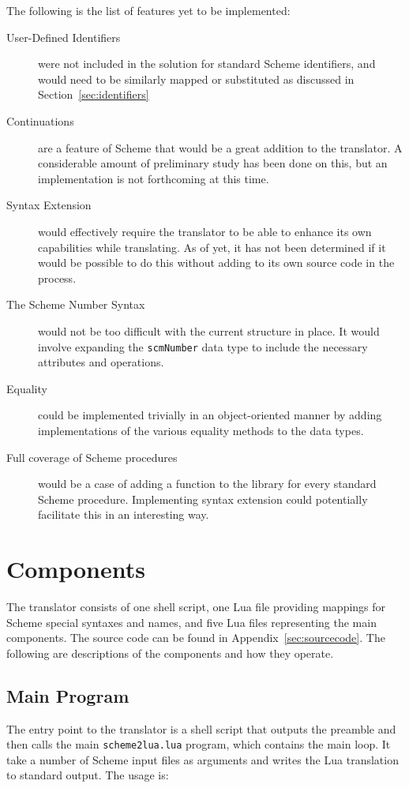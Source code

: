 The following is the list of features yet to be implemented:
\begin{description}
\item[User-Defined Identifiers] were not included in the solution for standard
Scheme identifiers, and would need to be similarly mapped or substituted as
discussed in Section~\ref{sec:identifiers}
\item[Continuations] are a feature of Scheme that would be a great addition to
the translator. A considerable amount of preliminary study has been done on
this, but an implementation is not forthcoming at this time.
\item[Syntax Extension] would effectively require the translator to be able to
enhance its own capabilities while translating. As of yet, it has not been
determined if it would be possible to do this without adding to its own source
code in the process.
\item[The Scheme Number Syntax] would not be too difficult with the current
structure in place. It would involve expanding the \texttt{scmNumber} data type
to include the necessary attributes and operations.
\item[Equality] could be implemented trivially in an object-oriented manner
by adding implementations of the various equality methods to the data types.
\item[Full coverage of Scheme procedures] would be a case of adding a function
to the library for every standard Scheme procedure. Implementing syntax
extension could potentially facilitate this in an interesting way.
\end{description}


\section{Components}

The translator consists of one shell script, one Lua file providing mappings for
Scheme special syntaxes and names, and five Lua files representing the main
components. The source code can be found in Appendix~\ref{sec:sourcecode}. The
following are descriptions of the components and how they operate.

\subsection{Main Program}

The entry point to the translator is a shell script that outputs the preamble
and then calls the main \texttt{scheme2lua.lua} program, which contains the main
loop. It take a number of Scheme input files as arguments and writes the Lua
translation to standard output. The usage is:


